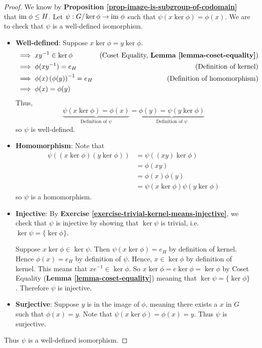 \begin{proof}
    We know by \textbf{Proposition \ref{prop-image-is-subgroup-of-codomain}} that $\mathrm{im}\;\phi \leq H$. Let $\psi: G/\ker\phi \to \mathrm{im}\;\phi$ such that $\psi(x\ker\phi) = \phi(x)$. We are to check that $\psi$ is a well-defined isomorphism.
    \begin{itemize}
        \item \textbf{Well-defined}: Suppose $x\ker\phi = y\ker\phi$.
        \begin{align*}
            &\implies xy^{-1} \in \ker\phi & \text{(Coset Equality, \textbf{Lemma \ref{lemma-coset-equality}})}\\
            &\implies\phi(xy^{-1}) = e_H & \text{(Definition of kernel)}\\
            &\implies\phi(x)\left(\phi(y)\right)^{-1} = e_H & \text{(Definition of homomorphism)}\\
            &\implies\phi(x) = \phi(y)
        \end{align*}
        Thus,
        \[
            \underbrace{\psi(x\ker\phi) = \phi(x)}_{\text{Definition of } \psi} = \underbrace{\phi(y) = \psi(y\ker\phi)}_{\text{Definition of } \psi}
        \]
        so $\psi$ is well-defined.

        \item \textbf{Homomorphism}: Note that
        \begin{align*}
            \psi((x\ker\phi)(y\ker\phi)) &= \psi((xy)\ker\phi)\\
            &= \phi(xy)\\
            &= \phi(x)\phi(y)\\
            &= \psi(x\ker\phi)\psi(y\ker\phi)
        \end{align*}
        so $\psi$ is a homomorphism.
        \item \textbf{Injective}: By \textbf{Exercise \ref{exercise-trivial-kernel-means-injective}}, we check that $\psi$ is injective by showing that $\ker\psi$ is trivial, i.e. $\ker\psi = \{\ker\phi\}$.

        Suppose $x\ker\phi\in\ker\psi$. Then $\psi(x\ker\phi) = e_H$ by definition of kernel. Hence $\phi(x) = e_H$ by definition of $\psi$. Hence, $x \in \ker\phi$ by definition of kernel. This means that $xe^{-1} \in \ker\phi$. So $x\ker\phi = e\ker\phi = \ker\phi$ by Coset Equality (\textbf{Lemma \ref{lemma-coset-equality}}) meaning that $\ker\psi = \{\ker\phi\}$. Therefore $\psi$ is injective.

        \item \textbf{Surjective}: Suppose $y$ is in the image of $\phi$, meaning there exists a $x$ in $G$ such that $\phi(x) = y$. Note that $\psi(x\ker\phi) = \phi(x) = y$. Thus $\psi$ is surjective.
    \end{itemize}
    Thus $\psi$ is a well-defined isomorphism.


\end{proof}
